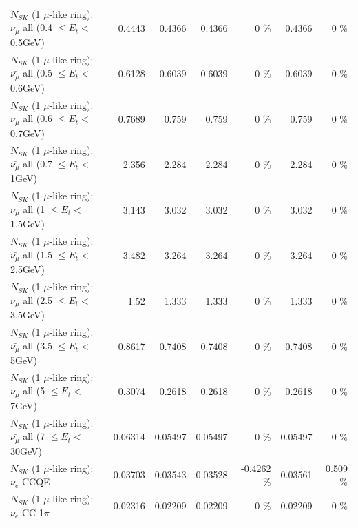 \begin{table}
\begin{tabular}{| l | r | r | r  r | r  r |}
 $N_{SK}$ (1 $\mu$-like ring): $\bar{\nu_{\mu}}$ all (0.4 $\leq E_{t} <$ 0.5GeV) &          0.4443 &          0.4366 &          0.4366 &        0 \%  &          0.4366 &        0 \%  \\ 
 $N_{SK}$ (1 $\mu$-like ring): $\bar{\nu_{\mu}}$ all (0.5 $\leq E_{t} <$ 0.6GeV) &          0.6128 &          0.6039 &          0.6039 &        0 \%  &          0.6039 &        0 \%  \\ 
 $N_{SK}$ (1 $\mu$-like ring): $\bar{\nu_{\mu}}$ all (0.6 $\leq E_{t} <$ 0.7GeV) &          0.7689 &           0.759 &           0.759 &        0 \%  &           0.759 &        0 \%  \\ 
   $N_{SK}$ (1 $\mu$-like ring): $\bar{\nu_{\mu}}$ all (0.7 $\leq E_{t} <$ 1GeV) &           2.356 &           2.284 &           2.284 &        0 \%  &           2.284 &        0 \%  \\ 
   $N_{SK}$ (1 $\mu$-like ring): $\bar{\nu_{\mu}}$ all (1 $\leq E_{t} <$ 1.5GeV) &           3.143 &           3.032 &           3.032 &        0 \%  &           3.032 &        0 \%  \\ 
 $N_{SK}$ (1 $\mu$-like ring): $\bar{\nu_{\mu}}$ all (1.5 $\leq E_{t} <$ 2.5GeV) &           3.482 &           3.264 &           3.264 &        0 \%  &           3.264 &        0 \%  \\ 
 $N_{SK}$ (1 $\mu$-like ring): $\bar{\nu_{\mu}}$ all (2.5 $\leq E_{t} <$ 3.5GeV) &            1.52 &           1.333 &           1.333 &        0 \%  &           1.333 &        0 \%  \\ 
   $N_{SK}$ (1 $\mu$-like ring): $\bar{\nu_{\mu}}$ all (3.5 $\leq E_{t} <$ 5GeV) &          0.8617 &          0.7408 &          0.7408 &        0 \%  &          0.7408 &        0 \%  \\ 
     $N_{SK}$ (1 $\mu$-like ring): $\bar{\nu_{\mu}}$ all (5 $\leq E_{t} <$ 7GeV) &          0.3074 &          0.2618 &          0.2618 &        0 \%  &          0.2618 &        0 \%  \\ 
    $N_{SK}$ (1 $\mu$-like ring): $\bar{\nu_{\mu}}$ all (7 $\leq E_{t} <$ 30GeV) &         0.06314 &         0.05497 &         0.05497 &        0 \%  &         0.05497 &        0 \%  \\ 
\hline
\hline
\hline
                                      $N_{SK}$ (1 $\mu$-like ring): $\nu_e$ CCQE &         0.03703 &         0.03543 &         0.03528 &  -0.4262 \%  &         0.03561 &    0.509 \%  \\ 
                                 $N_{SK}$ (1 $\mu$-like ring): $\nu_e$ CC 1$\pi$ &         0.02316 &         0.02209 &         0.02209 &        0 \%  &         0.02209 &        0 \%  \\ 

\end{tabular}
\end{table}
